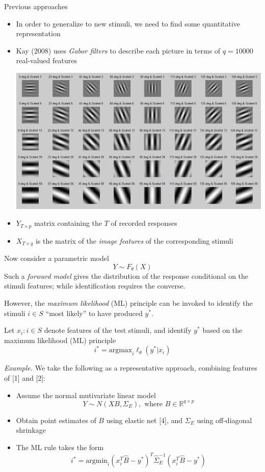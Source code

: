 \documentclass[final]{beamer}
\newlength{\onecolwid}
\begin{document}
\begin{frame}[t]
\begin{columns}[t]
\begin{column}{\onecolwid}
\begin{block}{Previous approaches}
\begin{itemize}
\item In order to generalize to new stimuli, we need to find some quantitative representation
\item Kay (2008) uses \emph{Gabor filters} to describe each picture in terms of $q = 10000$ real-valued features
\begin{center}\includegraphics[scale = 0.7, trim = 0in 2.5in 0in 0in, clip]{gabor.png}
\end{center}
\item $Y_{T \times p}$ matrix containing the $T$ of recorded responses
\item $X_{T \times q}$ is the matrix of the \emph{image features} of the corresponding stimuli
\end{itemize}

Now consider a parametric model
\[
Y \sim F_\theta(X)
\]
Such a \emph{forward model} gives the distribution of the
response conditional on the stimuli features;
while identification requires the converse.

However, the \emph{maximum likelihood} (ML) principle can be invoked to
identify the stimuli $i \in S$ ``most likely'' to have produced $y^*$.

Let $x_i : i \in S$ denote features of the test stimuli, and
identify $y^*$ based on the maximum likelihood (ML) principle
\[
i^* = \text{argmax}_i \ell_\theta(y^*| x_i)
\]

\emph{Example.} We take the following as a representative approach, combining features of [1] and [2]:
\begin{itemize}
\item Assume the normal mutivariate linear model
\[Y \sim N( XB , \Sigma_E), \text{ where }B \in \mathbb{R}^{q \times p}\]
\item Obtain point estimates of $B$ using elastic net [4], and $\Sigma_E$ using off-diagonal shrinkage
\item The ML rule takes the form
\begin{equation}\label{mlrule}
i^* = \text{argmin}_{i} (x_i^T \hat{B} - y^*)^T \hat{\Sigma}_E^{-1} (x_i^T \hat{B} - y^*)
\end{equation}
\end{itemize}
\end{block}


\end{column}
\end{columns}
\end{frame}
\end{document}
